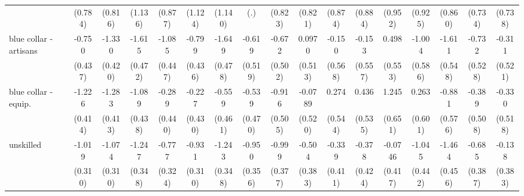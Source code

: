 {\begin{tabular}{l*{16}{c}}
                    &     (0.784)         &     (0.816)         &     (1.136)         &     (0.877)         &     (1.124)         &     (1.140)         &         (.)         &     (0.823)         &     (0.821)         &     (0.874)         &     (0.884)         &     (0.952)         &     (0.925)         &     (0.860)         &     (0.734)         &     (0.738)         \\
[1em]
blue collar - artisans&      -0.750         &      -1.330\sym{**} &      -1.615\sym{***}&      -1.085\sym{*}  &      -0.799         &      -1.649\sym{***}&      -0.619         &      -0.672         &      0.0970         &      -0.150         &      -0.153         &       0.498         &      -1.004         &      -1.611\sym{**} &      -0.732         &      -0.311         \\
                    &     (0.437)         &     (0.420)         &     (0.472)         &     (0.447)         &     (0.436)         &     (0.478)         &     (0.519)         &     (0.502)         &     (0.513)         &     (0.568)         &     (0.557)         &     (0.553)         &     (0.586)         &     (0.548)         &     (0.528)         &     (0.521)         \\
[1em]
blue collar - equip.&      -1.226\sym{**} &      -1.283\sym{**} &      -1.089\sym{*}  &      -0.289         &      -0.227         &      -0.559         &      -0.539         &      -0.916         &     -0.0789         &       0.274         &       0.436         &       1.245         &       0.263         &      -0.881         &      -0.389         &      -0.330         \\
                    &     (0.414)         &     (0.413)         &     (0.438)         &     (0.440)         &     (0.430)         &     (0.461)         &     (0.470)         &     (0.505)         &     (0.520)         &     (0.544)         &     (0.535)         &     (0.651)         &     (0.601)         &     (0.576)         &     (0.508)         &     (0.518)         \\
[1em]
unskilled           &      -1.019\sym{***}&      -1.074\sym{***}&      -1.247\sym{***}&      -0.777\sym{*}  &      -0.931\sym{**} &      -1.243\sym{***}&      -0.950\sym{**} &      -0.999\sym{**} &      -0.504         &      -0.339         &      -0.378         &     -0.0746         &      -1.045\sym{*}  &      -1.464\sym{**} &      -0.685         &      -0.138         \\
                    &     (0.310)         &     (0.310)         &     (0.348)         &     (0.324)         &     (0.310)         &     (0.348)         &     (0.356)         &     (0.377)         &     (0.383)         &     (0.411)         &     (0.424)         &     (0.417)         &     (0.442)         &     (0.456)         &     (0.387)         &     (0.383)         \\

\end{tabular}}
